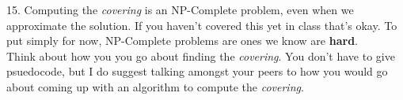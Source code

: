 \documentclass[12pt]{article}
\begin{document}
15. Computing the \textit{covering} is an NP-Complete problem, even when we approximate the solution. 
If you haven't covered this yet in class that's okay.
To put simply for now, NP-Complete problems are ones we know are \textbf{hard}.\\
Think about how you you go about finding the \textit{covering}. You don't have to give psuedocode,
but I do suggest talking amongst your peers to how you would go about coming up with an algorithm
to compute the \textit{covering}.
\newpage
\end{document}
